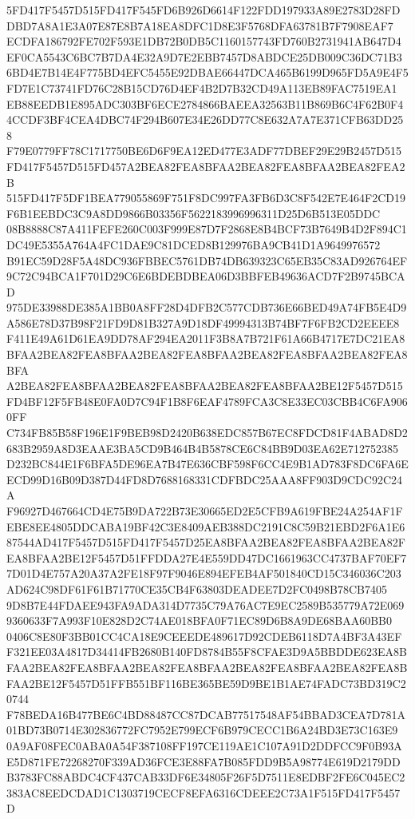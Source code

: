 \documentclass[UTF8,fontset=fandol,zihao=-4,a4paper]{ctexart}
\begin{document}
{{5FD417F5457D515FD417F545FD6B926D6614F122FDD197933A89E2783D28FDDBD7A8A1E3A07E87E8B7A18EA8DFC1D8E3F5768DFA63781B7F7908EAF7
ECDFA186792FE702F593E1DB72B0DB5C1160157743FD760B2731941AB647D4EF0CA5543C6BC7B7DA4E32A9D7E2EBB7457D8ABDCE25DB009C36DC71B3
6BD4E7B14E4F775BD4EFC5455E92DBAE66447DCA465B6199D965FD5A9E4F5FD7E1C73741FD76C28B15CD76D4EF4B2D7B32CD49A113EB89FAC7519EA1
EB88EEDB1E895ADC303BF6ECE2784866BAEEA32563B11B869B6C4F62B0F44CCDF3BF4CEA4DBC74F294B607E34E26DD77C8E632A7A7E371CFB63DD258
F79E0779FF78C1717750BE6D6F9EA12ED477E3ADF77DBEF29E29B2457D515FD417F5457D515FD457A2BEA82FEA8BFAA2BEA82FEA8BFAA2BEA82FEA2B
515FD417F5DF1BEA779055869F751F8DC997FA3FB6D3C8F542E7E464F2CD19F6B1EEBDC3C9A8DD9866B03356F5622183996996311D25D6B513E05DDC
08B8888C87A411FEFE260C003F999E87D7F2868E8B4BCF73B7649B4D2F894C1DC49E5355A764A4FC1DAE9C81DCED8B129976BA9CB41D1A9649976572
B91EC59D28F5A48DC936FBBEC5761DB74DB639323C65EB35C83AD926764EF9C72C94BCA1F701D29C6E6BDEBDBEA06D3BBFEB49636ACD7F2B9745BCAD
975DE33988DE385A1BB0A8FF28D4DFB2C577CDB736E66BED49A74FB5E4D9A586E78D37B98F21FD9D81B327A9D18DF49994313B74BF7F6FB2CD2EEEE8
F411E49A61D61EA9DD78AF294EA2011F3B8A7B721F61A66B4717E7DC21EA8BFAA2BEA82FEA8BFAA2BEA82FEA8BFAA2BEA82FEA8BFAA2BEA82FEA8BFA
A2BEA82FEA8BFAA2BEA82FEA8BFAA2BEA82FEA8BFAA2BE12F5457D515FD4BF12F5FB48E0FA0D7C94F1B8F6EAF4789FCA3C8E33EC03CBB4C6FA9060FF
C734FB85B58F196E1F9BEB98D2420B638EDC857B67EC8FDCD81F4ABAD8D2683B2959A8D3EAAE3BA5CD9B464B4B5878CE6C84BB9D03EA62E712752385
D232BC844E1F6BFA5DE96EA7B47E636CBF598F6CC4E9B1AD783F8DC6FA6EECD99D16B09D387D44FD8D7688168331CDFBDC25AAA8FF903D9CDC92C24A
F96927D467664CD4E75B9DA722B73E30665ED2E5CFB9A619FBE24A254AF1FEBE8EE4805DDCABA19BF42C3E8409AEB388DC2191C8C59B21EBD2F6A1E6
87544AD417F5457D515FD417F5457D25EA8BFAA2BEA82FEA8BFAA2BEA82FEA8BFAA2BE12F5457D51FFDDA27E4E559DD47DC1661963CC4737BAF70EF7
7D01D4E757A20A37A2FE18F97F9046E894EFEB4AF501840CD15C346036C203AD624C98DF61F61B71770CE35CB4F63803DEADEE7D2FC0498B78CB7405
9D8B7E44FDAEE943FA9ADA314D7735C79A76AC7E9EC2589B535779A72E0699360633F7A993F10E828D2C74AE018BFA0F71EC89D6B8A9DE68BAA60BB0
0406C8E80F3BB01CC4CA18E9CEEEDE489617D92CDEB6118D7A4BF3A43EFF321EE03A4817D34414FB2680B140FD8784B55F8CFAE3D9A5BBDDE623EA8B
FAA2BEA82FEA8BFAA2BEA82FEA8BFAA2BEA82FEA8BFAA2BEA82FEA8BFAA2BE12F5457D51FFB551BF116BE365BE59D9BE1B1AE74FADC73BD319C20744
F78BEDA16B477BE6C4BD88487CC87DCAB77517548AF54BBAD3CEA7D781A01BD73B0714E302836772FC7952E799ECF6B979CECC1B6A24BD3E73C163E9
0A9AF08FEC0ABA0A54F387108FF197CE119AE1C107A91D2DDFCC9F0B93AE5D871FE72268270F339AD36FCE3E88FA7B085FDD9B5A98774E619D2179DD
B3783FC88ABDC4CF437CAB33DF6E34805F26F5D7511E8EDBF2FE6C045EC2383AC8EEDCDAD1C1303719CECF8EFA6316CDEEE2C73A1F515FD417F5457D
}}
\end{document}
